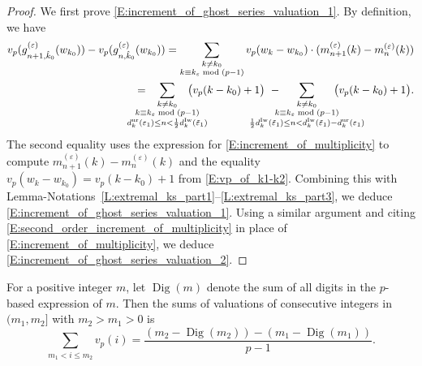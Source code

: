\begin{proof}
    We first prove \eqref{E:increment_of_ghost_series_valuation_1}.
    By definition, we have
    \begin{align*}
    v_p(g_{n+1, \hat k_0}^{(\varepsilon)}(w_{k_0})) - v_p(g_{n, \hat k_0}^{(\varepsilon)}(w_{k_0})) =
    \sum_{\substack{k \neq k_0\\k \equiv k_\varepsilon \bmod{(p-1)}}} v_p(w_k-w_{k_0}) \cdot (m_{n+1}^{(\varepsilon)}(k) - m_{n}^{(\varepsilon)}(k))
    \\=  \hspace{-20pt}
    \sum_{\substack{
    k \neq k_0
    \\k \equiv k_\varepsilon \bmod{(p-1)}
    \\
    d_{k}^{\mathrm{ur}}(\varepsilon_1) \leq n < \frac 12 d_{k}^{\mathrm{Iw}}(\tilde \varepsilon_1)}}
    \hspace{-20pt}\big( v_p(k-k_0)+1 \big)\ -  \hspace{-30pt} \sum_{\substack{
    k \neq k_0
    \\k \equiv k_\varepsilon \bmod{(p-1)}
    \\
    \frac 12 d_{k}^{\mathrm{Iw}}(\tilde \varepsilon_1)  \leq n < d_{k}^{{\mathrm{Iw}}}(\tilde \varepsilon_1) - d_{k}^{\mathrm{ur}}(\varepsilon_1)  }}
    \hspace{-30pt}\big( v_p(k-k_0)+1 \big).
    \end{align*}
    The second equality uses the expression for \eqref{E:increment_of_multiplicity} to compute $m_{n+1}^{(\varepsilon)}(k) - m_{n}^{(\varepsilon)}(k)$ and the equality $v_p(w_k-w_{k_0}) =v_p(k-k_0)+1$ from \eqref{E:vp_of_k1-k2}.
    Combining this with Lemma-Notations~\ref{L:extremal_ks_part1}--\ref{L:extremal_ks_part3}, we deduce \eqref{E:increment_of_ghost_series_valuation_1}.
    Using a similar argument and citing \eqref{E:second_order_increment_of_multiplicity} in place of \eqref{E:increment_of_multiplicity}, we deduce \eqref{E:increment_of_ghost_series_valuation_2}.
\end{proof}

\begin{notation}
    \label{E:sum_of_consecutive_valuations}
    For a positive integer $m$, let ${\operatorname{Dig}}(m)$ denote the sum of all digits in the $p$-based expression of $m$. Then the sums of valuations of consecutive integers in $(m_1, m_2]$ with $m_2 > m_1>0$ is
    \begin{equation}
    \sum_{m_1< i \leq m_2} v_p(i) = \frac{(m_2-{\operatorname{Dig}}(m_2) )-(m_1 -{\operatorname{Dig}}(m_1))} {p-1}.
    \end{equation}
\end{notation}

